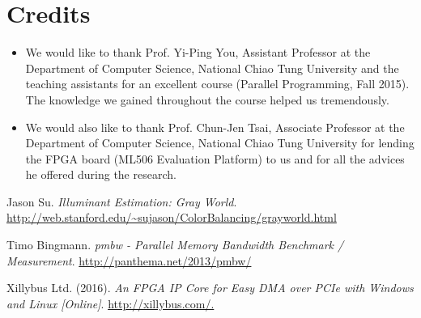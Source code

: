 \documentclass{acm_proc_article-sp}
\begin{document}
\section{Credits}
\begin{itemize}
\item We would like to thank Prof. Yi-Ping You, Assistant Professor at the Department of Computer Science, National Chiao Tung University and the teaching assistants for an excellent course (Parallel Programming, Fall 2015). The knowledge we gained throughout the course helped us tremendously.
\item We would also like to thank Prof. Chun-Jen Tsai, Associate Professor at the Department of Computer Science, National Chiao Tung University for lending the FPGA board (ML506 Evaluation Platform) to us and for all the advices he offered during the research.
\end{itemize}

\begin{thebibliography}{9}
Jason Su.
\textit{Illuminant Estimation: Gray World}. 
\url{http://web.stanford.edu/~sujason/ColorBalancing/grayworld.html}

Timo Bingmann.
\textit{pmbw - Parallel Memory Bandwidth Benchmark / Measurement}.
\url{http://panthema.net/2013/pmbw/}

Xillybus Ltd. (2016).
\textit{An FPGA IP Core for Easy DMA over PCIe with Windows and Linux [Online]}. 
\url{http://xillybus.com/.}
\end{thebibliography}
\end{document}
